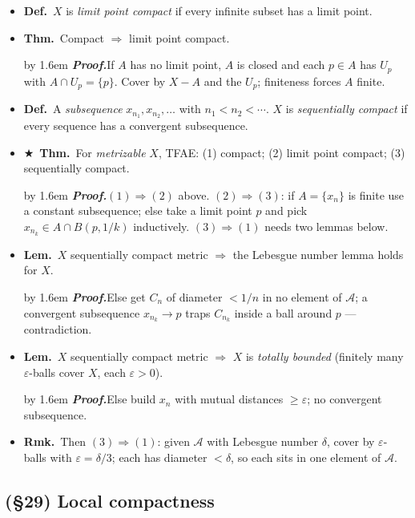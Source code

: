 \documentclass[12pt,a4paper]{article}
\newcommand{\Dfn}{\textbf{Def.}~}
\newcommand{\Thm}{\textbf{Thm.}~}
\newcommand{\Lem}{\textbf{Lem.}~}
\newcommand{\Rmk}{\textbf{Rmk.}~}
\newcommand{\Key}{$\bigstar$~}                  %
\newcommand{\Pf}[1]{%
  \par\addvspace{7pt}\nopagebreak
  \begingroup
    \advance\leftskip by 1.6em
    \parindent=0pt \small\color{prf}%
    \textbf{\textit{Proof.}}\enspace #1\par
  \endgroup
  \addvspace{9pt}}
\newenvironment{BL}%
  {\begin{itemize}[leftmargin=1.4em,labelsep=0.55em,itemsep=11pt,topsep=11pt,parsep=0pt]}%
  {\end{itemize}}
\newcommand{\cA}{\mathcal{A}}
\newcommand{\imp}{\Rightarrow}
\begin{document}
\begin{BL}
\item \Dfn $X$ is \emph{limit point compact} if every infinite subset has a limit point.
\item \Thm Compact $\imp$ limit point compact.
\Pf{If $A$ has no limit point, $A$ is closed and each $p\in A$ has $U_p$ with
$A\cap U_p=\{p\}$. Cover by $X-A$ and the $U_p$; finiteness forces $A$ finite.}
\item \Dfn A \emph{subsequence} $x_{n_1},x_{n_2},\dots$ with $n_1<n_2<\cdots$.
      $X$ is \emph{sequentially compact} if every sequence has a convergent subsequence.
\item \Key\Thm For \emph{metrizable} $X$, TFAE:
      (1) compact; (2) limit point compact; (3) sequentially compact.
\Pf{$(1)\imp(2)$ above.
$(2)\imp(3)$: if $A=\{x_n\}$ is finite use a constant subsequence; else take a limit point $p$
and pick $x_{n_k}\in A\cap B(p,1/k)$ inductively.
$(3)\imp(1)$ needs two lemmas below.}
\item \Lem $X$ sequentially compact metric $\imp$ the Lebesgue number lemma holds for $X$.
\Pf{Else get $C_n$ of diameter $<1/n$ in no element of $\cA$; a convergent subsequence
$x_{n_k}\to p$ traps $C_{n_k}$ inside a ball around $p$ --- contradiction.}
\item \Lem $X$ sequentially compact metric $\imp$ $X$ is \emph{totally bounded}
      (finitely many $\varepsilon$-balls cover $X$, each $\varepsilon>0$).
\Pf{Else build $x_n$ with mutual distances $\ge\varepsilon$; no convergent subsequence.}
\item \Rmk Then $(3)\imp(1)$: given $\cA$ with Lebesgue number $\delta$, cover by
      $\varepsilon$-balls with $\varepsilon=\delta/3$; each has diameter $<\delta$, so each sits
      in one element of $\cA$.
\end{BL}

\subsection{(\S29) Local compactness}
\end{document}
